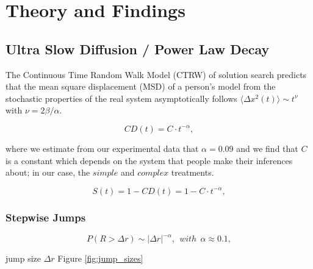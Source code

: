 \section{Theory and Findings}

\subsection{Ultra Slow Diffusion / Power Law Decay}

The Continuous Time Random Walk Model (CTRW) of solution search predicts that the mean square displacement (MSD) of a person's model from the stochastic properties of the real system asymptotically follows $\langle \Delta x^2 (t) \rangle \sim t^{\nu}$ with $\nu = 2\beta /\alpha$. 

\begin{equation}
\label{power_law_decay}
CD(t) = C \cdot t^{-\alpha},
\end{equation}

where we estimate from our experimental data that $\alpha = 0.09$ and we find that $C$ is a constant which depends on the system that people make their inferences about; in our case, the $simple$ and $complex$ treatments. 

\begin{equation}
\label{ultraslowdiffusion}
S(t) = 1 - CD(t) = 1- C \cdot t^{-\alpha},
\end{equation}


\subsubsection{Stepwise Jumps}

\begin{equation}
P(R > \Delta r) \sim |\Delta r|^{-\alpha}, ~~with~~\alpha \approx 0.1,
\end{equation}

jump size $\Delta r$ Figure \ref{fig:jump_sizes}

